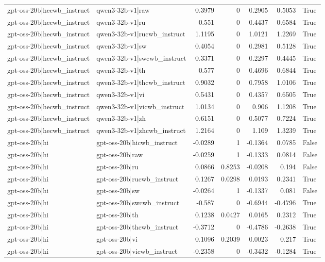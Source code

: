 \begin{table}
\begin{tabular}{l l r r r r l}
gpt-oss-20b|hecwb_instruct & qwen3-32b-v1|raw & 0.3979 & 0 & 0.2905 & 0.5053 & True \\
gpt-oss-20b|hecwb_instruct & qwen3-32b-v1|ru & 0.551 & 0 & 0.4437 & 0.6584 & True \\
gpt-oss-20b|hecwb_instruct & qwen3-32b-v1|rucwb_instruct & 1.1195 & 0 & 1.0121 & 1.2269 & True \\
gpt-oss-20b|hecwb_instruct & qwen3-32b-v1|sw & 0.4054 & 0 & 0.2981 & 0.5128 & True \\
gpt-oss-20b|hecwb_instruct & qwen3-32b-v1|swcwb_instruct & 0.3371 & 0 & 0.2297 & 0.4445 & True \\
gpt-oss-20b|hecwb_instruct & qwen3-32b-v1|th & 0.577 & 0 & 0.4696 & 0.6844 & True \\
gpt-oss-20b|hecwb_instruct & qwen3-32b-v1|thcwb_instruct & 0.9032 & 0 & 0.7958 & 1.0106 & True \\
gpt-oss-20b|hecwb_instruct & qwen3-32b-v1|vi & 0.5431 & 0 & 0.4357 & 0.6505 & True \\
gpt-oss-20b|hecwb_instruct & qwen3-32b-v1|vicwb_instruct & 1.0134 & 0 & 0.906 & 1.1208 & True \\
gpt-oss-20b|hecwb_instruct & qwen3-32b-v1|zh & 0.6151 & 0 & 0.5077 & 0.7224 & True \\
gpt-oss-20b|hecwb_instruct & qwen3-32b-v1|zhcwb_instruct & 1.2164 & 0 & 1.109 & 1.3239 & True \\
gpt-oss-20b|hi & gpt-oss-20b|hicwb_instruct & -0.0289 & 1 & -0.1364 & 0.0785 & False \\
gpt-oss-20b|hi & gpt-oss-20b|raw & -0.0259 & 1 & -0.1333 & 0.0814 & False \\
gpt-oss-20b|hi & gpt-oss-20b|ru & 0.0866 & 0.8253 & -0.0208 & 0.194 & False \\
gpt-oss-20b|hi & gpt-oss-20b|rucwb_instruct & 0.1267 & 0.0298 & 0.0193 & 0.2341 & True \\
gpt-oss-20b|hi & gpt-oss-20b|sw & -0.0264 & 1 & -0.1337 & 0.081 & False \\
gpt-oss-20b|hi & gpt-oss-20b|swcwb_instruct & -0.587 & 0 & -0.6944 & -0.4796 & True \\
gpt-oss-20b|hi & gpt-oss-20b|th & 0.1238 & 0.0427 & 0.0165 & 0.2312 & True \\
gpt-oss-20b|hi & gpt-oss-20b|thcwb_instruct & -0.3712 & 0 & -0.4786 & -0.2638 & True \\
gpt-oss-20b|hi & gpt-oss-20b|vi & 0.1096 & 0.2039 & 0.0023 & 0.217 & True \\
gpt-oss-20b|hi & gpt-oss-20b|vicwb_instruct & -0.2358 & 0 & -0.3432 & -0.1284 & True \\

\end{tabular}
\end{table}
